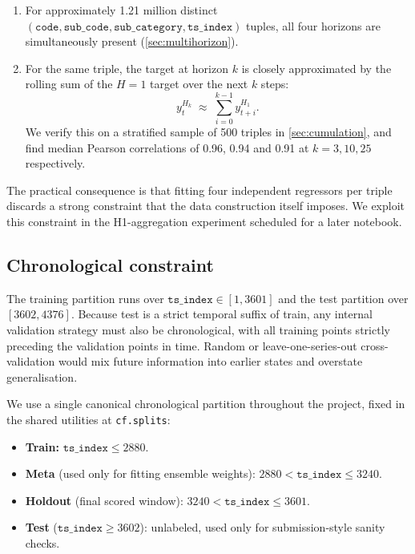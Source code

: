 \begin{enumerate}
  \item For approximately 1.21 million distinct $(\mathtt{code},\mathtt{sub\_code},\mathtt{sub\_category},\mathtt{ts\_index})$ tuples, all four horizons are simultaneously present (\cref{sec:multihorizon}).
  \item For the same triple, the target at horizon $k$ is closely approximated by the rolling sum of the $H=1$ target over the next $k$ steps:
  \[
    y^{H_k}_t \;\approx\; \sum_{i=0}^{k-1} y^{H_1}_{t+i}.
  \]
  We verify this on a stratified sample of 500 triples in \cref{sec:cumulation}, and find median Pearson correlations of 0.96, 0.94 and 0.91 at $k=3,10,25$ respectively.
\end{enumerate}

The practical consequence is that fitting four independent regressors per triple discards a strong constraint that the data construction itself imposes. We exploit this constraint in the H1-aggregation experiment scheduled for a later notebook.

\subsection{Chronological constraint}

The training partition runs over $\mathtt{ts\_index} \in [1, 3601]$ and the test partition over $[3602, 4376]$. Because test is a strict temporal suffix of train, any internal validation strategy must also be chronological, with all training points strictly preceding the validation points in time. Random or leave-one-series-out cross-validation would mix future information into earlier states and overstate generalisation.

We use a single canonical chronological partition throughout the project, fixed in the shared utilities at \texttt{cf.splits}:

\begin{itemize}
  \item \textbf{Train:} $\mathtt{ts\_index} \le 2880$.
  \item \textbf{Meta} (used only for fitting ensemble weights): $2880 < \mathtt{ts\_index} \le 3240$.
  \item \textbf{Holdout} (final scored window): $3240 < \mathtt{ts\_index} \le 3601$.
  \item \textbf{Test} ($\mathtt{ts\_index} \ge 3602$): unlabeled, used only for submission-style sanity checks.
\end{itemize}

